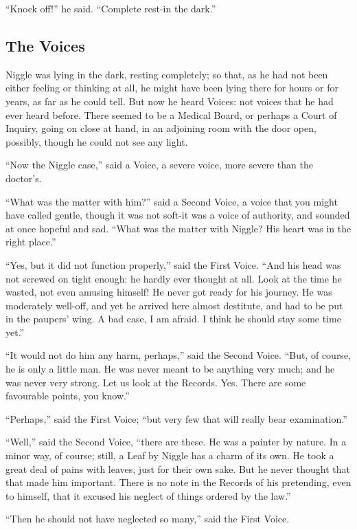\documentclass[english]{scrartcl}
\begin{document}
“Knock off!” he said. “Complete rest-in the dark.”

\subsection*{The Voices}

Niggle was lying in the dark, resting completely; so that, as he had not been either feeling or thinking at all, he might have been lying there for hours or for years, as far as he could tell. But now he heard Voices: not voices that he had ever heard before. There seemed to be a Medical Board, or perhaps a Court of Inquiry, going on close at hand, in an adjoining room with the door open, possibly, though he could not see any light.

“Now the Niggle case,” said a Voice, a severe voice, more severe than the doctor’s.

“What was the matter with him?” said a Second Voice, a voice that you might have called gentle, though it was not soft-it was a voice of authority, and sounded at once hopeful and sad. “What was the matter with Niggle? His heart was in the right place.”

“Yes, but it did not function properly,” said the First Voice. “And his head was not screwed on tight enough: he hardly ever thought at all. Look at the time he wasted, not even amusing himself! He never got ready for his journey. He was moderately well-off, and yet he arrived here almost destitute, and had to be put in the paupers’ wing. A bad case, I am afraid. I think he should stay some time yet.”

“It would not do him any harm, perhaps,” said the Second Voice. “But, of course, he is only a little man. He was never meant to be anything very much; and he was never very strong. Let us look at the Records. Yes. There are some favourable points, you know.”

“Perhaps,” said the First Voice; “but very few that will really bear examination.”

“Well,” said the Second Voice, “there are these. He was a painter by nature. In a minor way, of course; still, a Leaf by Niggle has a charm of its own. He took a great deal of pains with leaves, just for their own sake. But he never thought that that made him important. There is no note in the Records of his pretending, even to himself, that it excused his neglect of things ordered by the law.”

“Then he should not have neglected so many,” said the First Voice.
\end{document}
